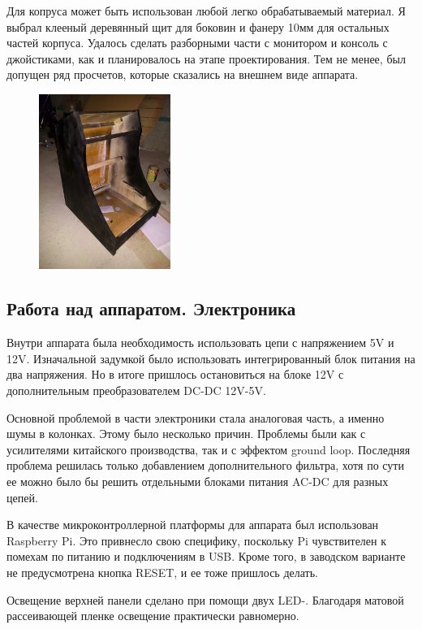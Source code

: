 \documentclass[10pt, a5paper]{article}
\begin{document}
Для копруса может быть использован любой легко обрабатываемый материал. Я выбрал клееный деревянный щит для боковин и фанеру 10мм для остальных частей корпуса. 
Удалось сделать разборными части с монитором и консоль с джойстиками, как и планировалось на этапе проектирования.
Тем не менее, был допущен ряд просчетов, которые сказались на внешнем виде аппарата.

\begin{figure}[h!]
  \centering
  \includegraphics[height=5.7cm]{27_2016_Sorokin3.png}
\end{figure}


\subsection*{Работа над аппаратом. Электроника}

Внутри аппарата была необходимость использовать цепи с напряжением 5V и 12V. Изначальной задумкой было использовать интегрированный блок питания на два напряжения. Но в итоге пришлось остановиться на блоке 12V с дополнительным преобразователем DC-DC 12V-5V.

Основной проблемой в части электроники стала аналоговая \linebreak часть, а именно шумы в колонках. Этому было несколько причин.
Проблемы были как с усилителями китайского производства, так и с эффектом ground loop. Последняя проблема решилась только добавлением дополнительного фильтра, хотя по сути ее можно было бы решить отдельными блоками питания AC-DC для разных цепей.

В качестве микроконтроллерной платформы для аппарата был использован Raspberry Pi. Это привнесло свою специфику, поскольку Pi чувствителен к помехам по питанию и подключениям в USB. Кроме того, в заводском варианте не предусмотрена кнопка RESET, и ее тоже пришлось делать.

Освещение верхней панели сделано при помощи двух LED-. Благодаря матовой рассеивающей пленке освещение практически равномерно.
\end{document}
